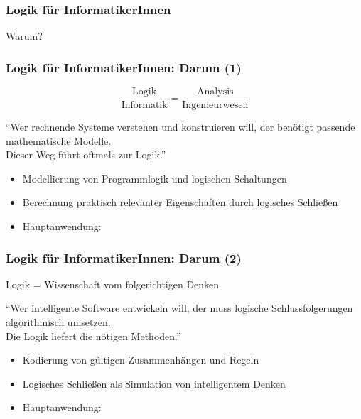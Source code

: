 \documentclass[aspectratio=1610,onlymath]{beamer}
\begin{document}
\begin{frame}\frametitle{Logik für InformatikerInnen}

\pause
\begin{center}
\Huge Warum?
\end{center}

\end{frame}

\begin{frame}\frametitle{Logik für InformatikerInnen: Darum (1)}

\begin{center}
\LARGE 
\[ \frac{\text{Logik}}{\text{Informatik}} = \frac{\text{Analysis}}{\text{Ingenieurwesen}}\]

\bigskip
\large
"`Wer rechnende Systeme verstehen und konstruieren will, der benötigt passende mathematische Modelle.\\Dieser Weg führt oftmals zur Logik."'
\end{center}


\begin{itemize}
\item Modellierung von Programm\alert{logik} und \alert{logischen} Schaltungen
\item Berechnung praktisch relevanter Eigenschaften durch logisches Schließen
\item Hauptanwendung: 
\end{itemize}

\end{frame}

\begin{frame}\frametitle{Logik für InformatikerInnen: Darum (2)}

\begin{center}
\LARGE 
Logik = Wissenschaft vom folgerichtigen Denken

\bigskip
\large
"`Wer intelligente Software entwickeln will, der muss logische Schlussfolgerungen algorithmisch umsetzen.\\
Die Logik liefert die nötigen Methoden."'
\end{center}


\begin{itemize}
\item Kodierung von gültigen Zusammenhängen und Regeln
\item Logisches Schließen als Simulation von intelligentem Denken
\item Hauptanwendung: 
\end{itemize}

\end{frame}
\end{document}

